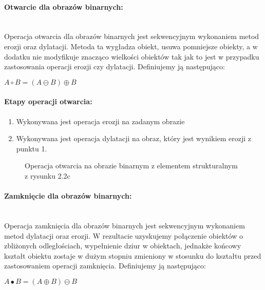 \documentclass[a4paper,12pt,twoside,openany]{report}
\newcommand{\ImgPath}{.}
\begin{document}
\paragraph{Otwarcie dla obrazów binarnych:}\mbox{} \\
\indent Operacja otwarcia dla obrazów binarnych jest sekwencyjnym wykonaniem metod erozji oraz dylatacji. Metoda ta wygładza obiekt, usuwa pomniejsze obiekty, a w dodatku nie modyfikuje znacząco wielkości obiektów tak jak to jest w przypadku zastosowania operacji erozji czy dylatacji. Definiujemy ją następująco:
\begin{center}
	$ A \circ B = (A \ominus B) \oplus B $ 
\end{center}

\paragraph{Etapy operacji otwarcia:}
\begin{enumerate}
	\item Wykonywana jest operacja erozji na zadanym obrazie
	\item Wykonywana jest operacja dylatacji na obraz, który jest wynikiem erozji z punktu 1.
\end{enumerate}

\begin{figure}[H]
	\centering
	\caption{Operacja otwarcia na obrazie binarnym z elementem strukturalnym z rysunku 2.2c}
\end{figure}

\paragraph{Zamknięcie dla obrazów binarnych:}\mbox{} \\
\indent Operacja zamknięcia dla obrazów binarnych jest sekwencyjnym wykonaniem metod dylatacji oraz erozji. W rezultacie uzyskujemy połączenie obiektów o zbliżonych odległościach, wypełnienie dziur w obiektach, jednakże końcowy kształt obiektu zostaje w dużym stopniu zmieniony w stosunku do kształtu przed zastosowaniem operacji zamknięcia. Definiujemy ją następująco:
\begin{center}
	$ A \bullet B = (A \oplus B) \ominus B $ 
\end{center}
\end{document}
